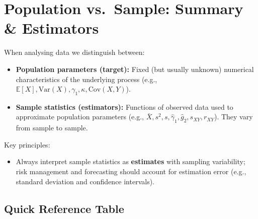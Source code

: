 \documentclass[
  12pt,
  a4paper,
]{scrbook}
\providecommand{\tightlist}{%
  \setlength{\itemsep}{0pt}\setlength{\parskip}{0pt}}
\renewcommand{\tightlist}{\setlength{\itemsep}{0.5\baselineskip}\setlength{\parskip}{0.2\baselineskip}}
\theoremstyle{plain}
\theoremstyle{definition}
\theoremstyle{remark}
\begin{document}
\section{Population vs.~Sample: Summary \&
Estimators}\label{population-vs.-sample-summary-estimators}

When analysing data we distinguish between:

\begin{itemize}
\tightlist
\item
  \textbf{Population parameters (target):} Fixed (but usually unknown)
  numerical characteristics of the underlying process (e.g.,
  \(\mathbb{E}[X], \text{Var}(X), \gamma_1, \kappa, \text{Cov}(X,Y)\)).
\item
  \textbf{Sample statistics (estimators):} Functions of observed data
  used to approximate population parameters (e.g.,
  \(\bar{X}, s^2, s, \hat{\gamma}_1, \hat{g}_2, s_{XY}, r_{XY}\)). They
  vary from sample to sample.
\end{itemize}

Key principles:

\begin{itemize}
\tightlist
\item
  Always interpret sample statistics as \textbf{estimates} with sampling
  variability; risk management and forecasting should account for
  estimation error (e.g., standard deviation and confidence intervals).
\end{itemize}

\subsection{Quick Reference Table}\label{quick-reference-table}

\end{document}
